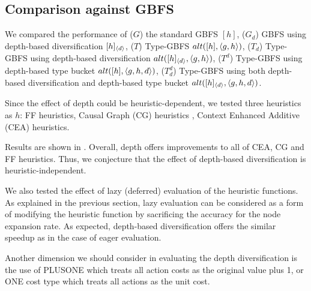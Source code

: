 \subsection{Comparison against GBFS}

We compared the performance of 
($G$) the standard GBFS
$[h]$,
($G_d$) GBFS using depth-based diversification
$[h]_{\relsize{-2}\brackets{d}}$,
($T$) Type-GBFS
$alt([h],{\left<g,h\right>})$,
($T_d$) Type-GBFS using depth-based diversification
$alt([h]_{{\left<d\right>}},{\left<g,h\right>})$,
($T^d$) Type-GBFS using depth-based type bucket
$alt([h],{\left<g,h,d\right>})$,
($T_d^d$) Type-GBFS using both depth-based diversification and depth-based type bucket
$alt([h]_{{\left<d\right>}},{\left<g,h,d\right>})$.

Since the effect of depth could be heuristic-dependent, we tested three
heuristics as $h$:
FF heuristics\cite{Hoffmann01}, Causal Graph (CG) heuristics \cite{Helmert2006}, Context Enhanced
Additive (CEA) heuristics\cite{helmert2008unifying}.




Results are shown in . Overall, depth offers
improvements to all of CEA, CG and FF heuristics. Thus, we conjecture
that the effect of depth-based diversification is heuristic-independent.

We also tested the effect of lazy (deferred) evaluation of the
heuristic functions. As explained in the previous section, lazy
evaluation can be considered as a form of modifying the heuristic
function by sacrificing the accuracy for the node expansion rate.
As expected, depth-based diversification offers the similar speedup as
in the case of eager evaluation.

Another dimension we should consider in evaluating the depth
diversification is the use of PLUSONE which treats all
action costs as the original value plus 1, or ONE cost type which treats
all actions as the unit cost.

\newcommand{\etitle}[2]{ \multicolumn{#1}{|c||}{Eager} & \multicolumn{#1}{|c|#2}{Lazy}}
\newcommand{\htitle}[2]{\multicolumn{#1}{c|}{CEA} & \multicolumn{#1}{|c|}{CG} & \multicolumn{#1}{|c|#2}{FF}}
\newcommand{\titles}[3]{
&\etitle{#1}{#3} \\
\hline
&\htitle{#2}{|} #3 &\htitle{#2}{}\\
\hline
}

